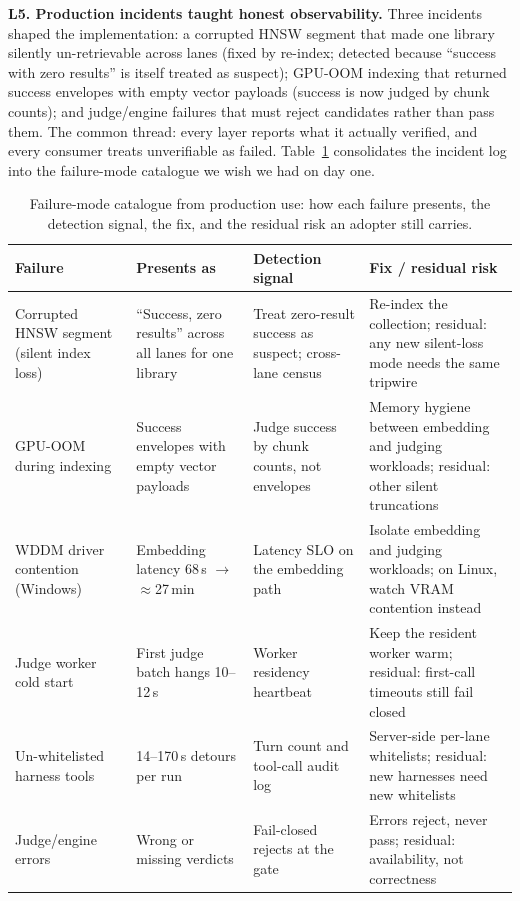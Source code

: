 \textbf{L5. Production incidents taught honest observability.} Three
incidents shaped the implementation: a corrupted HNSW segment that made one
library silently un-retrievable across lanes (fixed by re-index; detected
because ``success with zero results'' is itself treated as suspect);
GPU-OOM indexing that returned success envelopes with empty vector payloads
(success is now judged by chunk counts); and judge/engine failures that
must reject candidates rather than pass them. The common thread: every
layer reports what it actually verified, and every consumer treats
unverifiable as failed. Table~\ref{tab:failures} consolidates the incident
log into the failure-mode catalogue we wish we had on day one.

\begin{table}[!htbp]
\centering
\footnotesize
\setlength{\tabcolsep}{4pt}
\caption{Failure-mode catalogue from production use: how each failure
presents, the detection signal, the fix, and the residual risk an adopter
still carries.}
\label{tab:failures}
\begin{tabular}{p{3.1cm}p{3.2cm}p{3.1cm}p{2.9cm}}
\toprule
Failure & Presents as & Detection signal & Fix / residual risk \\
\midrule
Corrupted HNSW segment (silent index loss) & ``Success, zero results''
across all lanes for one library & Treat zero-result success as suspect;
cross-lane census & Re-index the collection; residual: any new silent-loss
mode needs the same tripwire \\
GPU-OOM during indexing & Success envelopes with empty vector payloads &
Judge success by chunk counts, not envelopes & Memory hygiene between
embedding and judging workloads; residual: other silent truncations \\
WDDM driver contention (Windows) & Embedding latency 68\,s $\to$
$\approx$27\,min & Latency SLO on the embedding path & Isolate embedding
and judging workloads; on Linux, watch VRAM contention instead \\
Judge worker cold start & First judge batch hangs 10--12\,s & Worker
residency heartbeat & Keep the resident worker warm; residual: first-call
timeouts still fail closed \\
Un-whitelisted harness tools & 14--170\,s detours per run & Turn count and
tool-call audit log & Server-side per-lane whitelists; residual: new
harnesses need new whitelists \\
Judge/engine errors & Wrong or missing verdicts & Fail-closed rejects at
the gate & Errors reject, never pass; residual: availability, not
correctness \\
\bottomrule
\end{tabular}
\end{table}

